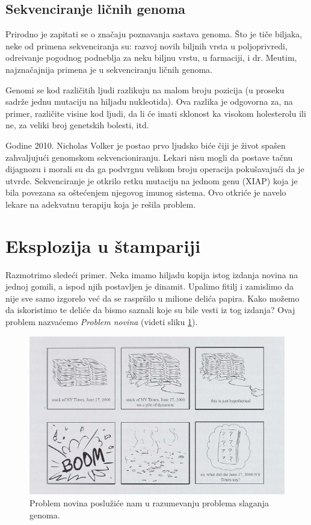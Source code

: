 \subsection{Sekvenciranje ličnih genoma}

Prirodno je zapitati se o značaju poznavanja sastava genoma. \v Sto je ti\v ce biljaka, neke od primena sekvenciranja su: razvoj novih biljnih vrsta u poljoprivredi, odre\dj ivanje pogodnog podneblja za neku biljnu vrstu, u farmaciji, i dr. Me\dj utim, najzna\v cajnija primena je u sekvenciranju li\v cnih genoma.

Genomi se kod različitih ljudi razlikuju na malom broju pozicija (u proseku sadrže jednu mutaciju na hiljadu nukleotida). Ova razlika je odgovorna za, na primer, različite visine kod ljudi, da li će imati sklonost ka visokom holesterolu ili ne, za veliki broj genetskih bolesti, itd.

Godine 2010. Nicholas Volker je postao prvo ljudsko biće čiji je život spašen zahvaljujući genomskom sekvencioniranju. Lekari nisu mogli da postave tačnu dijagnozu i morali su da ga podvrgnu velikom broju operacija pokušavajući da je utvrde. Sekvenciranje je otkrilo retku mutaciju na jednom genu (XIAP) koja je bila povezana sa oštećenjem njegovog imunog sistema. Ovo otkriće je navelo lekare na adekvatnu terapiju koja je rešila problem.

\section{Eksplozija u štampariji}

Razmotrimo slede\'ci primer. Neka imamo hiljadu kopija istog izdanja novina na jednoj gomili, a ispod njih postavljen je dinamit. Upalimo fitilj i zamislimo da nije sve samo izgorelo već da se raspršilo u milione delića papira. Kako možemo da iskoristimo te deliće da bismo saznali koje su bile vesti iz tog izdanja? Ovaj problem nazvaćemo \emph{Problem novina} (videti sliku \ref{slika:eksplozija}). 

\begin{figure}[h]
	\centering
	\includegraphics[width=1\textwidth]{poglavlja/3/slike/eksplozija.png}
	\caption{Problem novina poslužiće nam u razumevanju problema slaganja genoma.}
	\label{slika:eksplozija}
\end{figure} 

